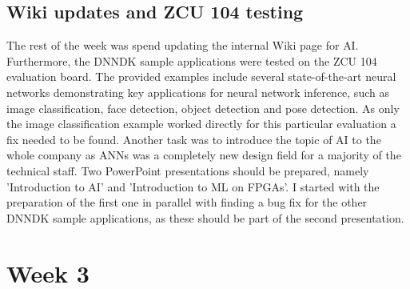 \subsection{Wiki updates and ZCU 104 testing}
The rest of the week was spend updating the internal Wiki page for \ac{AI}. Furthermore, the \ac{DNNDK} sample applications were tested on the ZCU 104 evaluation board. The provided examples include several state-of-the-art neural networks demonstrating key applications for neural network inference, such as image classification, face detection, object detection and pose detection. As only the image classification example worked directly for this particular evaluation a fix needed to be found. Another task was to introduce the topic of \ac{AI} to the whole company as \acp{ANN} was a completely new design field for a majority of the technical staff. Two PowerPoint presentations should be prepared, namely 'Introduction to \ac{AI}' and 'Introduction to \ac{ML} on \acp{FPGA}'. I started with the preparation of the first one in parallel with finding a bug fix for the other \ac{DNNDK} sample applications, as these should be part of the second presentation.

\section{Week 3}
